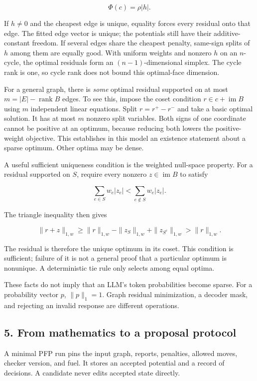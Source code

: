 \documentclass[
  11pt,
]{article}
\begin{document}
\[
\Phi(c)=\rho|h|.
\]

If \(h\neq0\) and the cheapest edge is unique, equality forces every
residual onto that edge. The fitted edge vector is unique; the
potentials still have their additive-constant freedom. If several edges
share the cheapest penalty, same-sign splits of \(h\) among them are
equally good. With uniform weights and nonzero \(h\) on an \(n\)-cycle,
the optimal residuals form an \((n-1)\)-dimensional simplex. The cycle
rank is one, so cycle rank does not bound this optimal-face dimension.

For a general graph, there is \emph{some} optimal residual supported on
at most \(m=|E|-\operatorname{rank}B\) edges. To see this, impose the
coset condition \(r\in c+\operatorname{im}B\) using \(m\) independent
linear equations. Split \(r=r^+-r^-\) and take a basic optimal solution.
It has at most \(m\) nonzero split variables. Both signs of one
coordinate cannot be positive at an optimum, because reducing both
lowers the positive-weight objective. This establishes in this model an
existence statement about a sparse optimum. Other optima may be dense.

A useful sufficient uniqueness condition is the weighted null-space
property. For a residual supported on \(S\), require every nonzero
\(z\in\operatorname{im}B\) to satisfy

\[
\sum_{e\in S}w_e|z_e|<\sum_{e\notin S}w_e|z_e|.
\]

The triangle inequality then gives

\[
\|r+z\|_{1,w}\geq
\|r\|_{1,w}-\|z_S\|_{1,w}+\|z_{S^c}\|_{1,w}>
\|r\|_{1,w}.
\]

The residual is therefore the unique optimum in its coset. This
condition is sufficient; failure of it is not a general proof that a
particular optimum is nonunique. A deterministic tie rule only selects
among equal optima.

These facts do not imply that an LLM's token probabilities become
sparse. For a probability vector \(p\), \(\|p\|_1=1\). Graph residual
minimization, a decoder mask, and rejecting an invalid response are
different operations.

\subsection{5. From mathematics to a proposal
protocol}\label{from-mathematics-to-a-proposal-protocol}

A minimal PFP run pins the input graph, reports, penalties, allowed
moves, checker version, and fuel. It stores an accepted potential and a
record of decisions. A candidate never edits accepted state directly.
\end{document}
